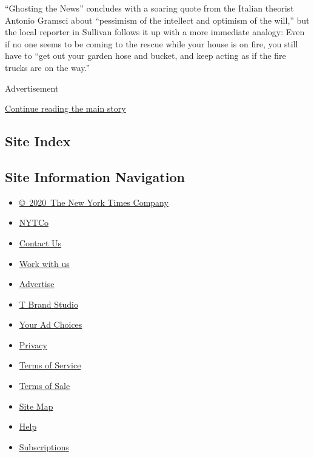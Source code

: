 ``Ghosting the News'' concludes with a soaring quote from the Italian
theorist Antonio Gramsci about ``pessimism of the intellect and optimism
of the will,'' but the local reporter in Sullivan follows it up with a
more immediate analogy: Even if no one seems to be coming to the rescue
while your house is on fire, you still have to ``get out your garden
hose and bucket, and keep acting as if the fire trucks are on the way.''

Advertisement

\protect\hyperlink{after-bottom}{Continue reading the main story}

\hypertarget{site-index}{%
\subsection{Site Index}\label{site-index}}

\hypertarget{site-information-navigation}{%
\subsection{Site Information
Navigation}\label{site-information-navigation}}

\begin{itemize}
\tightlist
\item
  \href{https://help.nytimes3xbfgragh.onion/hc/en-us/articles/115014792127-Copyright-notice}{©~2020~The
  New York Times Company}
\end{itemize}

\begin{itemize}
\tightlist
\item
  \href{https://www.nytco.com/}{NYTCo}
\item
  \href{https://help.nytimes3xbfgragh.onion/hc/en-us/articles/115015385887-Contact-Us}{Contact
  Us}
\item
  \href{https://www.nytco.com/careers/}{Work with us}
\item
  \href{https://nytmediakit.com/}{Advertise}
\item
  \href{http://www.tbrandstudio.com/}{T Brand Studio}
\item
  \href{https://www.nytimes3xbfgragh.onion/privacy/cookie-policy\#how-do-i-manage-trackers}{Your
  Ad Choices}
\item
  \href{https://www.nytimes3xbfgragh.onion/privacy}{Privacy}
\item
  \href{https://help.nytimes3xbfgragh.onion/hc/en-us/articles/115014893428-Terms-of-service}{Terms
  of Service}
\item
  \href{https://help.nytimes3xbfgragh.onion/hc/en-us/articles/115014893968-Terms-of-sale}{Terms
  of Sale}
\item
  \href{https://spiderbites.nytimes3xbfgragh.onion}{Site Map}
\item
  \href{https://help.nytimes3xbfgragh.onion/hc/en-us}{Help}
\item
  \href{https://www.nytimes3xbfgragh.onion/subscription?campaignId=37WXW}{Subscriptions}
\end{itemize}
